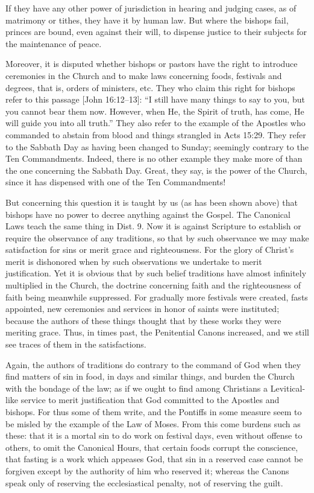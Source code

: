 If they have any other power of jurisdiction in hearing and judging cases, as of matrimony or tithes, they have it by human law. But where the bishops fail, princes are bound, even against their will, to dispense justice to their subjects for the maintenance of peace.

Moreover, it is disputed whether bishops or pastors have the right to introduce ceremonies in the Church and to make laws concerning foods, festivals and degrees, that is, orders of ministers, etc. They who claim this right for bishops refer to this passage [John 16:12–13]: “I still have many things to say to you, but you cannot bear them now. However, when He, the Spirit of truth, has come, He will guide you into all truth.” They also refer to the example of the Apostles who commanded to abstain from blood and things strangled in Acts 15:29. They refer to the Sabbath Day as having been changed to Sunday; seemingly contrary to the Ten Commandments. Indeed, there is no other example they make more of than the one concerning the Sabbath Day. Great, they say, is the power of the Church, since it has dispensed with one of the Ten Commandments!

But concerning this question it is taught by us (as has been shown above) that bishops have no power to decree anything against the Gospel. The Canonical Laws teach the same thing in Dist. 9. Now it is against Scripture to establish or require the observance of any traditions, so that by such observance we may make satisfaction for sins or merit grace and righteousness. For the glory of Christ’s merit is dishonored when by such observations we undertake to merit justification. Yet it is obvious that by such belief traditions have almost infinitely multiplied in the Church, the doctrine concerning faith and the righteousness of faith being meanwhile suppressed. For gradually more festivals were created, fasts appointed, new ceremonies and services in honor of saints were instituted; because the authors of these things thought that by these works they were meriting grace. Thus, in times past, the Penitential Canons increased, and we still see traces of them in the satisfactions.

Again, the authors of traditions do contrary to the command of God when they find matters of sin in food, in days and similar things, and burden the Church with the bondage of the law; as if we ought to find among Christians a Levitical-like service to merit justification that God committed to the Apostles and bishops. For thus some of them write, and the Pontiffs in some measure seem to be misled by the example of the Law of Moses. From this come burdens such as these: that it is a mortal sin to do work on festival days, even without offense to others, to omit the Canonical Hours, that certain foods corrupt the conscience, that fasting is a work which appeases God, that sin in a reserved case cannot be forgiven except by the authority of him who reserved it; whereas the Canons speak only of reserving the ecclesiastical penalty, not of reserving the guilt.

